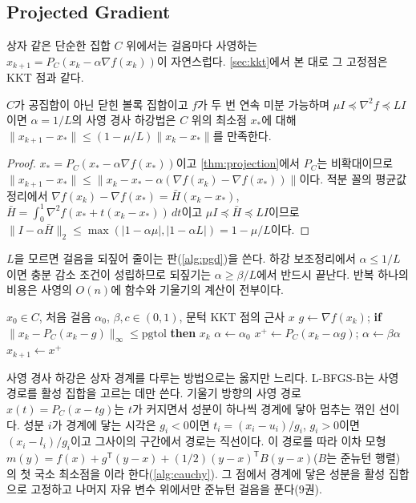 \subsection{Projected Gradient}

상자 같은 단순한 집합 $C$ 위에서는 걸음마다 사영하는  $x_{k+1}=P_C(x_k-\alpha\nabla f(x_k))$이 자연스럽다. \cref{sec:kkt}에서 본 대로 그 고정점은 KKT 점과 같다.

\begin{proposition}
\label{prop:projected-gd}
$C$가 공집합이 아닌 닫힌 볼록 집합이고 $f$가 두 번 연속 미분 가능하며 $\mu I\preceq\nabla^2f\preceq LI$이면 $\alpha=1/L$의 사영 경사 하강법은 $C$ 위의 최소점 $x_\ast$에 대해 $\|x_{k+1}-x_\ast\|\le(1-\mu/L)\|x_k-x_\ast\|$를 만족한다.
\end{proposition}

\begin{proof}
$x_\ast=P_C(x_\ast-\alpha\nabla f(x_\ast))$이고 \cref{thm:projection}에서 $P_C$는 비확대이므로 $\|x_{k+1}-x_\ast\|\le\|x_k-x_\ast-\alpha(\nabla f(x_k)-\nabla f(x_\ast))\|$이다. 적분 꼴의 평균값 정리에서 $\nabla f(x_k)-\nabla f(x_\ast)=\bar H(x_k-x_\ast)$, $\bar H=\int_0^1\nabla^2f(x_\ast+t(x_k-x_\ast))\,dt$이고 $\mu I\preceq\bar H\preceq LI$이므로 $\|I-\alpha\bar H\|_2\le\max(|1-\alpha\mu|,|1-\alpha L|)=1-\mu/L$이다.
\end{proof}

$L$을 모르면 걸음을 되짚어 줄이는 판(\cref{alg:pgd})을 쓴다. 하강 보조정리에서 $\alpha\le1/L$이면 충분 감소 조건이 성립하므로 되짚기는 $\alpha\ge\beta/L$에서 반드시 끝난다. 반복 하나의 비용은 사영의 $O(n)$에 함수와 기울기의 계산이 전부이다.

\begin{algorithm}[htbp]
\begin{algorithmic}[1]
\Require $x_0\in C$, 처음 걸음 $\alpha_0$, $\beta,c\in(0,1)$, 문턱 
\Ensure KKT 점의 근사 $x$
  \State $g\gets\nabla f(x_k)$; \textbf{if} $\|x_k-P_C(x_k-g)\|_\infty\le\mathrm{pgtol}$ \textbf{then} \Return $x_k$ 
  \State $\alpha\gets\alpha_0$
  \Repeat
    \State $x^+\gets P_C(x_k-\alpha g)$; $\alpha\gets\beta\alpha$
   
  \State $x_{k+1}\gets x^+$
\EndFor
\end{algorithmic}
\caption{되짚기 걸음의 사영 경사 하강}
\label{alg:pgd}
\end{algorithm}

사영 경사 하강은 상자 경계를 다루는 방법으로는 옳지만 느리다. L-BFGS-B\cite{byrd1995lbfgsb}는 사영 경로를 활성 집합을 고르는 데만 쓴다. 기울기 방향의 사영 경로 $x(t)=P_C(x-tg)$는 $t$가 커지면서 성분이 하나씩 경계에 닿아 멈추는 꺾인 선이다. 성분 $i$가 경계에 닿는 시각은 $g_i<0$이면 $t_i=(x_i-u_i)/g_i$, $g_i>0$이면 $(x_i-l_i)/g_i$이고 그사이의 구간에서 경로는 직선이다. 이 경로를 따라 이차 모형 $m(y)=f(x)+g^{\mathsf T}(y-x)+(1/2)(y-x)^{\mathsf T}B(y-x)$($B$는 준뉴턴 행렬)의 첫 국소 최소점을 이라 한다(\cref{alg:cauchy}). 그 점에서 경계에 닿은 성분을 활성 집합으로 고정하고 나머지 자유 변수 위에서만 준뉴턴 걸음을 푼다(9권).

